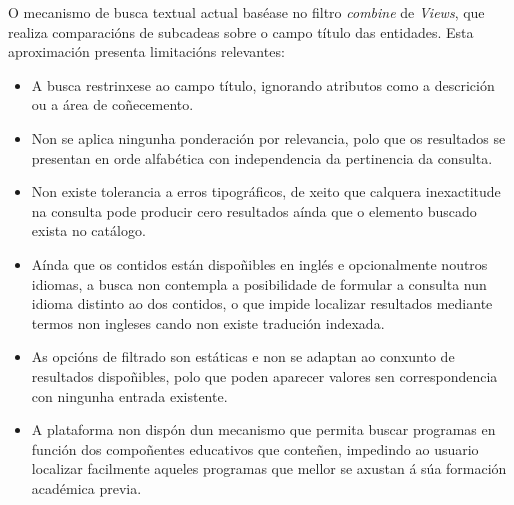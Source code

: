 \documentclass[%
    a4paper,               %
    twoside,               %
    10pt,                  %
]{article}                 %
\begin{document}
O mecanismo de busca textual actual baséase no filtro \textit{combine} de \textit{Views}, que realiza comparacións de subcadeas sobre o campo título das entidades. Esta aproximación presenta limitacións relevantes:
\begin{itemize}
    \item A busca restrinxese ao campo título, ignorando atributos como a descrición ou a área de coñecemento.
    \item Non se aplica ningunha ponderación por relevancia, polo que os resultados se presentan en orde alfabética con independencia da pertinencia da consulta.
    \item Non existe tolerancia a erros tipográficos, de xeito que calquera inexactitude na consulta pode producir cero resultados aínda que o elemento buscado exista no catálogo.
    \item Aínda que os contidos están dispoñibles en inglés e opcionalmente noutros idiomas, a busca non contempla a posibilidade de formular a consulta nun idioma distinto ao dos contidos, o que impide localizar resultados mediante termos non ingleses cando non existe tradución indexada.
    \item As opcións de filtrado son estáticas e non se adaptan ao conxunto de resultados dispoñibles, polo que poden aparecer valores sen correspondencia con ningunha entrada existente.
    \item A plataforma non dispón dun mecanismo que permita buscar programas en función dos compoñentes educativos que conteñen, impedindo ao usuario localizar facilmente aqueles programas que mellor se axustan á súa formación académica previa.
\end{itemize}

\end{document}
